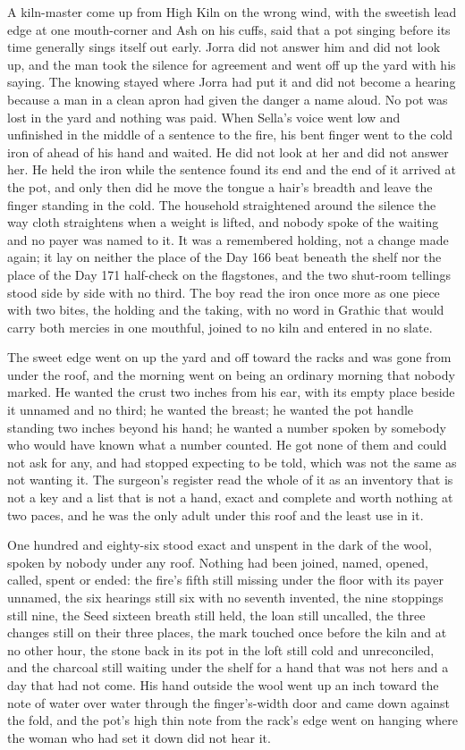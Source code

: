 A kiln-master come up from High Kiln on the wrong wind, with the sweetish lead edge at one mouth-corner and Ash on his cuffs, said that a pot singing before its time generally sings itself out early. Jorra did not answer him and did not look up, and the man took the silence for agreement and went off up the yard with his saying. The knowing stayed where Jorra had put it and did not become a hearing because a man in a clean apron had given the danger a name aloud. No pot was lost in the yard and nothing was paid. When Sella's voice went low and unfinished in the middle of a sentence to the fire, his bent finger went to the cold iron of  ahead of his hand and waited. He did not look at her and did not answer her. He held the iron while the sentence found its end and the end of it arrived at the pot, and only then did he move the tongue a hair's breadth and leave the finger standing in the cold. The household straightened around the silence the way cloth straightens when a weight is lifted, and nobody spoke of the waiting and no payer was named to it. It was a remembered holding, not a change made again; it lay on neither the place of the Day 166 beat beneath the shelf nor the place of the Day 171 half-check on the flagstones, and the two shut-room tellings stood side by side with no third. The boy read the iron once more as one piece with two bites, the holding and the taking, with no word in Grathic that would carry both mercies in one mouthful, joined to no kiln and entered in no slate.

The sweet edge went on up the yard and off toward the racks and was gone from under the roof, and the morning went on being an ordinary morning that nobody marked. He wanted the crust two inches from his ear, with its empty place beside it unnamed and no third; he wanted the breast; he wanted the pot handle standing two inches beyond his hand; he wanted a number spoken by somebody who would have known what a number counted. He got none of them and could not ask for any, and had stopped expecting to be told, which was not the same as not wanting it. The surgeon's register read the whole of it as an inventory that is not a key and a list that is not a hand, exact and complete and worth nothing at two paces, and he was the only adult under this roof and the least use in it.

One hundred and eighty-six stood exact and unspent in the dark of the wool, spoken by nobody under any roof. Nothing had been joined, named, opened, called, spent or ended: the fire's fifth still missing under the floor with its payer unnamed, the six hearings still six with no seventh invented, the nine stoppings still nine, the Seed sixteen breath still held, the loan still uncalled, the three changes still on their three places, the mark touched once before the kiln and at no other hour, the stone back in its pot in the loft still cold and unreconciled, and the charcoal still waiting under the shelf for a hand that was not hers and a day that had not come. His hand outside the wool went up an inch toward the note of water over water through the finger's-width door and came down against the fold, and the pot's high thin note from the rack's edge went on hanging where the woman who had set it down did not hear it.
